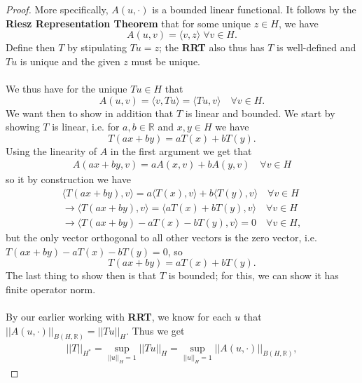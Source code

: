 \documentclass[12pt]{article}
\newenvironment{ex}[2][Exercise]{\begin{trivlist}
\item[\hskip \labelsep {\bfseries #1}\hskip \labelsep {\bfseries #2.}]}{\end{trivlist}}
\begin{document}
\begin{ex}{4}
\begin{enumerate}[label=(\alph*)]
\begin{enumerate}[label=(\arabic*)]
\begin{proof}
                More specifically, $A(u, \cdot)$ is a bounded linear functional. It follows by the \textbf{Riesz Representation Theorem} that for some unique $z \in H$, we have 
                $$A(u, v) = \langle v, z \rangle \; \forall v \in H.$$
                Define then $T$ by stipulating $Tu = z$; the \textbf{RRT} also thus has $T$ is well-defined and $Tu$ is unique and the given $z$ must be unique. \\ \\
                We thus have for the unique $Tu \in H$ that
                $$A(u,v) = \langle v, Tu \rangle = \langle Tu, v \rangle \quad \forall v \in H.$$
                We want then to show in addition that $T$ is linear and bounded. We start by showing $T$ is linear, i.e. for $a, b \in \mathbb{R}$ and $x, y \in H$ we have 
                $$T(ax + by) = aT(x) + bT(y).$$
                Using the linearity of $A$ in the first argument we get that
                \begin{align*}
                    A(ax + by, v) = aA(x, v) + bA(y, v) \quad \forall v \in H
                \end{align*}
                so it by construction we have 
                \begin{align*}
                    \langle T(ax + by), v \rangle = a\langle T(x), v \rangle + b\langle T(y), v \rangle \quad \forall v \in H\\
                    \longrightarrow \langle T(ax + by), v \rangle = \langle aT(x) + bT(y), v \rangle \quad \forall v \in H \\
                    \longrightarrow \langle T(ax + by) - aT(x) - bT(y), v \rangle = 0 \quad \forall v \in H,
                \end{align*}
                but the only vector orthogonal to all other vectors is the zero vector, i.e. $T(ax + by) - aT(x) - bT(y) = 0$, so 
                $$T(ax + by) = aT(x) + bT(y).$$
                The last thing to show then is that $T$ is bounded; for this, we can show it has finite operator norm. \\ \\
                By our earlier working with \textbf{RRT}, we know for each $u$ that $||A(u, \cdot)||_{B(H, \mathbb{R})} = ||Tu||_H$. Thus we get 
                \begin{align*}
                    ||T||_{H^*} = \underset{||u||_H = 1}{\sup} ||Tu||_H = \underset{||u||_H = 1}{\sup} ||A(u, \cdot)||_{B(H, \mathbb{R})},
                \end{align*}

\end{proof}
\end{enumerate}
\end{enumerate}
\end{ex}
\end{document}
